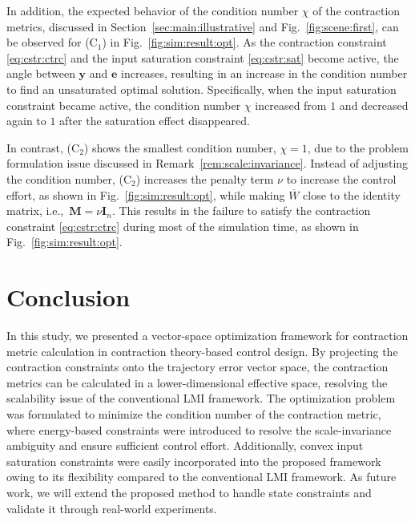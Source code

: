 \documentclass{ifacconf}
\newcommand\ie{\textrm{i.e.,\ }}
\newcommand*{\mv}[1]{\boldsymbol{#1}} %
\newcommand*{\mm}[1]{\boldsymbol{#1}} %
\begin{document}
In addition, the expected behavior of the condition number $\chi$ of the contraction metrics, discussed in Section~\ref{sec:main:illustrative} and Fig.~\ref{fig:scene:first}, can be observed for (C$_1$) in Fig.~\ref{fig:sim:result:opt}.
As the contraction constraint \eqref{eq:cstr:ctrc} and the input saturation constraint \eqref{eq:cstr:sat} become active, the angle between $\mv{y}$ and $\mv{e}$ increases, resulting in an increase in the condition number to find an unsaturated optimal solution.
Specifically, when the input saturation constraint became active, the condition number $\chi$ increased from $1$ and decreased again to $1$ after the saturation effect disappeared.

In contrast, (C$_2$) shows the smallest condition number, $\chi=1$, due to the problem formulation issue discussed in Remark~\ref{rem:scale:invariance}.
Instead of adjusting the condition number, (C$_2$) increases the penalty term $\nu$ to increase the control effort, as shown in Fig.~\ref{fig:sim:result:opt}, while making $\overline{W}$ close to the identity matrix, \ie $\mm{M}=\nu\mm{I}_n$.
This results in the failure to satisfy the contraction constraint \eqref{eq:cstr:ctrc} during most of the simulation time, as shown in Fig.~\ref{fig:sim:result:opt}.

\section{Conclusion} \label{sec:conclusion}

In this study, we presented a vector-space optimization framework for contraction metric calculation in contraction theory-based control design.
By projecting the contraction constraints onto the trajectory error vector space, the contraction metrics can be calculated in a lower-dimensional effective space, resolving the scalability issue of the conventional LMI framework.
The optimization problem was formulated to minimize the condition number of the contraction metric, where energy-based constraints were introduced to resolve the scale-invariance ambiguity and ensure sufficient control effort. 
Additionally, convex input saturation constraints were easily incorporated into the proposed framework owing to its flexibility compared to the conventional LMI framework.
As future work, we will extend the proposed method to handle state constraints and validate it through real-world experiments.


\end{document}
